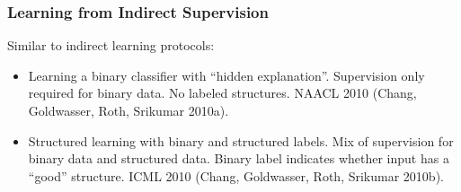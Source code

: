

\begin{frame}
  \frametitle{Learning from Indirect Supervision}
  Similar to indirect learning protocols:
  \begin{itemize}
  \item Learning a binary classifier with ``hidden explanation''. Supervision
    only required for binary data. No labeled structures. NAACL 2010 (Chang,
    Goldwasser, Roth, Srikumar 2010a).
  \item Structured learning with binary and structured labels. Mix of
    supervision for binary data and structured data. Binary label indicates
    whether input has a ``good'' structure. ICML 2010 (Chang, Goldwasser, Roth,
    Srikumar 2010b).
  \end{itemize}
\end{frame}

